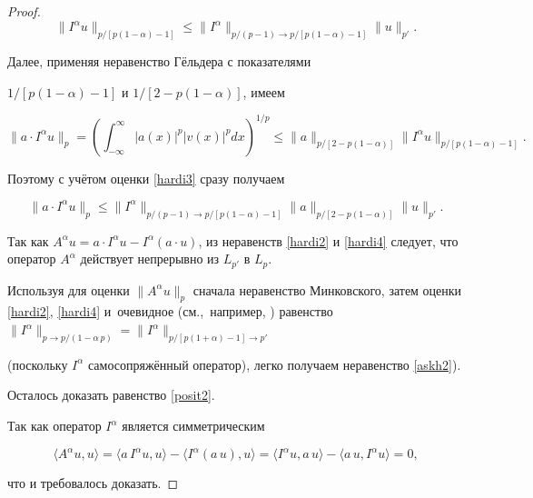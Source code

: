 \begin{proof}
\begin{equation}

\label{hardi3}

\|I^\alpha u\|_{p/[p(1-\alpha)-1]}\leq \|I^\alpha\|_{p/(p-1)\to p/[p(1-\alpha)-1]}\|u\|_{p'} .

\end{equation}

Далее, применяя неравенство Гёльдера с показателями

$1/[p(1{-}\alpha){-}1]$ и \mbox{$1/[2{-}p(1{-}\alpha)]$}, имеем

$$

\|a\cdot

I^\alpha

u\|_p=\left(\int _{-\infty}^{\infty}|a(x)|^p|v(x)|^pdx\right)^{1/p}\leq

\|a\|_{p/[2-p(1-\alpha)]}\|I^\alpha u\|_{p/[p(1-\alpha)-1]}.

$$

Поэтому с учётом оценки \eqref{hardi3} сразу получаем

\begin{equation}

\label{hardi4}

\|a\cdot I^\alpha u\|_p\leq \|I^\alpha\|_{p/(p-1)\to p/[p(1-\alpha)-1]}\|a\|_{p/[2-p(1-\alpha)]}\|u\|_{p'} .

\end{equation}

Так как $A^\alpha u=a\cdot I^\alpha u-I^\alpha(a\cdot u)$, из неравенств  \eqref{hardi2} и \eqref{hardi4} следует, что оператор $A^\alpha$ действует непрерывно из $L_{p'}$ в $L_p$. 

Используя для оценки $\|A^\alpha u\|_p$ сначала неравенство Минковского, затем оценки \eqref{hardi2}, \eqref{hardi4} и~очевидное (см.,~например, \cite[c.~247]{askhabov:KOLM}) равенство $\|I^\alpha\|_{p\to

p/(1-\alpha\,p)}=\|I^\alpha\|_{p/[p(1+\alpha)-1]\to p'}$

(поскольку $I^\alpha$ самосопряжённый оператор), легко получаем неравенство \eqref{askh2}).



Осталось доказать равенство \eqref{posit2}. 

Так как оператор $I^\alpha$ является симметрическим

$$

\langle A^\alpha u, u\rangle=\langle a\,I^\alpha u,

u\rangle-\langle I^\alpha (a\,u), u\rangle=\langle I^\alpha u,

a\,u\rangle-\langle a\,u, I^\alpha u\rangle=0,

$$

что и требовалось доказать.

\end{proof}




